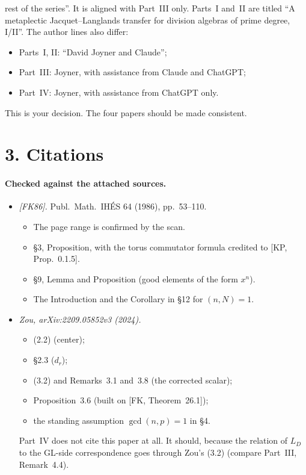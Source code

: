 \documentclass[11pt]{article}
\theoremstyle{definition}
\begin{document}
\begin{enumerate}[label=(\arabic*)]
rest of the series''. It is aligned with Part~III only. Parts~I and~II are
titled ``A metaplectic Jacquet--Langlands transfer for division algebras
of prime degree, I/II''. The author lines also differ:
\begin{itemize}
\item Parts~I, II: ``David Joyner and Claude'';
\item Part~III: Joyner, with assistance from Claude and ChatGPT;
\item Part~IV: Joyner, with assistance from ChatGPT only.
\end{itemize}
This is your decision. The four papers should be made consistent.
\end{enumerate}

\section*{3. Citations}
\paragraph{Checked against the attached sources.}
\begin{itemize}
\item \emph{[FK86].} Publ.\ Math.\ IH\'ES 64 (1986), pp.~53--110.
\begin{itemize}
\item The page range is confirmed by the scan.
\item \S3, Proposition, with the torus commutator formula credited to
[KP, Prop.~0.1.5].
\item \S9, Lemma and Proposition (good elements of the form $x^n$).
\item The Introduction and the Corollary in \S12 for $(n,N)=1$.
\end{itemize}
\item \emph{Zou, arXiv:2209.05852v3 (2024).}
\begin{itemize}
\item (2.2) (center);
\item \S2.3 ($d_r$);
\item (3.2) and Remarks~3.1 and~3.8 (the corrected scalar);
\item Proposition~3.6 (built on [FK, Theorem~26.1]);
\item the standing assumption $\gcd(n,p)=1$ in \S4.
\end{itemize}
Part~IV does not cite this paper at all. It should, because the relation
of $L_D$ to the GL-side correspondence goes through Zou's (3.2) (compare
Part~III, Remark~4.4).
\end{itemize}
\end{document}
